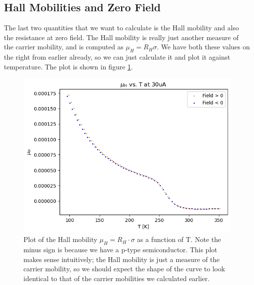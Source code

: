 \documentclass[10pt]{article}
\begin{document}
	\subsection{Hall Mobilities and Zero Field}
	The last two quantities that we want to calculate is the Hall mobility and also the resistance at zero
	field. The Hall mobility is really just another measure of the carrier mobility, and is computed as \(
	\mu_H = R_H \sigma \). We have both these values on the right from earlier already, so we can just
	calculate it and plot it against temperature. The plot is shown in figure \ref{hall-mobility}.

	\begin{figure}
		\centering
		\includegraphics[scale=0.7]{images/30uA-hall-mobility.png}
		\caption{Plot of the Hall mobility \( \mu_H = R_H \cdot \sigma \) as a function of T. Note the minus
			sign is because we have a p-type semiconductor. This plot makes sense intuitively; the Hall
			mobility is just a measure of the carrier mobility, so we should expect the shape of the curve to
		look identical to that of the carrier mobilities we calculated earlier.} 
		\label{hall-mobility}	
	\end{figure}
\end{document}
